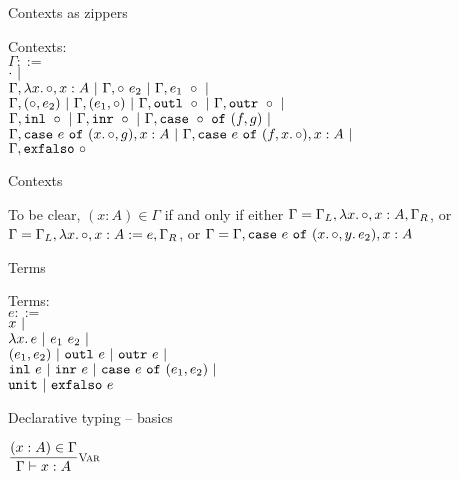 \documentclass{beamer}
\begin{document}
\begin{frame}{Contexts as zippers}

Contexts: \\
$\Gamma ::=$ \\
\qquad $\emptytypingctx \pipe$ \\
\qquad $\extendfun{\Gamma}{x}{A} \pipe \extendappl{\Gamma}{e_2} \pipe \extendappr{\Gamma}{e_1} \pipe$ \\
\qquad $\extendpairl{\Gamma}{e_2} \pipe \extendpairr{\Gamma}{e_1} \pipe \extendoutl{\Gamma} \pipe \extendoutr{\Gamma} \pipe$ \\
\qquad $\extendinl{\Gamma} \pipe \extendinr{\Gamma} \pipe \extendcasearg{\Gamma}{f}{g} \pipe$ \\
\qquad $\extendcasel{\Gamma}{e}{x}{A}{g} \pipe \extendcaser{\Gamma}{e}{f}{x}{A} \pipe$ \\
\qquad $\extendexfalso{\Gamma}$

\end{frame}

\begin{frame}{Contexts}

To be clear, $(x : A) \in \Gamma$ if and only if either $\Gamma = \extendfun{\Gamma_L}{x}{A}, \Gamma_R$, or $\Gamma = \extendfundef{\Gamma_L}{x}{A}{e}, \Gamma_R$, or $\Gamma = \extendcasel{\Gamma}{e}{x}{A}{y.\, e_2}$

\end{frame}

\begin{frame}{Terms}

Terms: \\
$e ::=$ \\
\qquad $x \pipe$ \\
\qquad $\fun{x}{e} \pipe \app{e_1}{e_2} \pipe$ \\
\qquad $\pair{e_1}{e_2} \pipe \outl{e} \pipe \outr{e} \pipe$ \\
\qquad $\inl{e} \pipe \inr{e} \pipe \case{e}{e_1}{e_2} \pipe$ \\
\qquad $\unit \pipe \exfalso{e}$

\end{frame}

\begin{frame}{Declarative typing -- basics}

\begin{center}
  $\infrule[Var]{\sidecond{(x : A) \in \Gamma}}{\typing{x}{A}}$
\end{center}

\end{frame}
\end{document}
